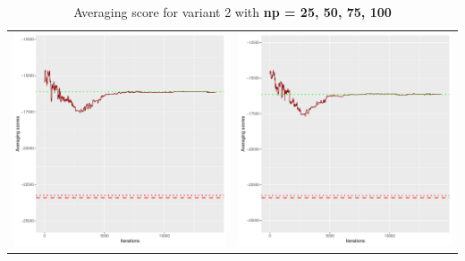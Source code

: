 \documentclass[]{scrartcl}
\begin{document}
\begin{table}[h!]
\begin{tabular}{cc}
\includegraphics[scale = 0.4]{./figs/win95pts/v2/75/avgBoundsEvolution-14252.pdf} & 
\includegraphics[scale = 0.4]{./figs/win95pts/v2/100/avgBoundsEvolution-14252.pdf} \\
\end{tabular}
\caption{Averaging score for variant 2 with \textbf{np =  25, 50, 75, 100}}
\end{table}
\end{document}
